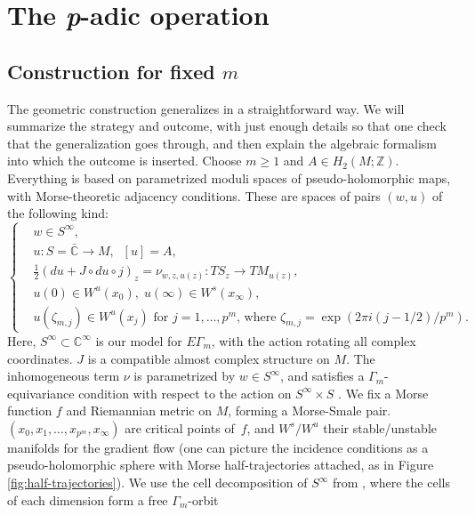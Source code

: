 \documentclass[JEP,XML,SOM,Unicode,NoFloatCountersInSection,published]{cedram}
\theoremstyle{plain}
\theoremstyle{definition}
\newcommand{\bC}{{\mathbb C}}
\newcommand{\bZ}{{\mathbb Z}}
\newcommand{\half}{{\textstyle\frac{1}{2}}}
\begin{document}
\section{The \texorpdfstring{{\normalfont\textit{p}}}{p}-adic operation}

\subsection{Construction for fixed $m$}
The geometric construction generalizes \cite[\S 4]{seidel-wilkins21} in a straightforward way. We will summarize the strategy and outcome, with just enough details so that one check that the generalization goes through, and then explain the algebraic formalism into which the outcome is inserted. Choose $m \!\geq\! 1$ and \hbox{$A \!\in\! H_2(M;\bZ)$}. Everything is based on parametrized moduli spaces of pseudo-holomorphic maps, with Morse-theoretic adjacency conditions. These are spaces of pairs $(w,u)$ of the following kind:
\begin{equation}\label{eq:parametrized-maps}
\left\{
\begin{aligned}
& w \in S^\infty, \\
& u: S = \bar{\bC} \to M, \;\; [u] = A, \\
& \half(du + J \circ du \circ j)_z = \nu_{w,z,u(z)}: TS_z \to TM_{u(z)}, \\
& u(0) \in W^u(x_0), \; u(\infty) \in W^s(x_\infty), \\
& u(\zeta_{m,j}) \in W^u(x_j) \text{ for $j = 1,\dots,p^m$, where $\zeta_{m,j} = \exp(2\pi i (j-1/2)/p^m)$.}
\end{aligned}
\right.
\end{equation}
Here, $S^\infty \subset \bC^\infty$ is our model for $E\Gamma_m$, with the action rotating all complex coordinates. $J$ is a compatible almost complex structure on $M$. The inhomogeneous term $\nu$ is parametrized by $w \in S^\infty$, and satisfies a $\Gamma_m$-equivariance condition with respect to the action on $S^\infty \times S$ \cite[Eq.\,(4.1)]{seidel-wilkins21}. We fix a Morse function $f$ and Riemannian metric on $M$, forming a Morse-Smale pair. $(x_0,x_1,\dots,x_{p^{m}},x_\infty)$ are critical points of~$f$, and $W^s/W^u$ their stable/unstable manifolds for the gradient flow (one can picture the incidence conditions as a pseudo-holomorphic sphere with Morse half-trajectories attached, as in Figure \ref{fig:half-trajectories}). We use the cell decomposition of $S^\infty$ from \cite[\S 2a]{seidel-wilkins21}, where the cells of each dimension form a free $\Gamma_m$-orbit
\end{document}
